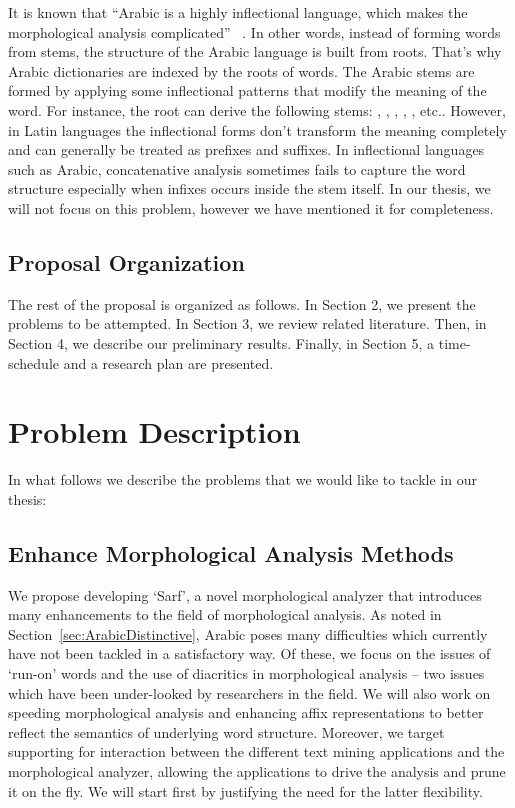 \documentclass[a4,12pt]{report}
\newcommand{\noVocRL}[1]{\transtrue\novocalize\RL{#1}\vocalize}
\begin{document}
	It is known that ``Arabic is a highly inflectional language, which makes the morphological
	analysis complicated'' ~\cite{Attia:08a}. In other words, instead of forming words from stems, the
	structure of the Arabic language is built from roots. That's why Arabic dictionaries are indexed by the roots of words.
	The Arabic stems are formed by applying some inflectional patterns that modify the meaning of the word.
	For instance, the root \noVocRL{drs} can derive the following stems: , , 
	, , , etc..
	However, in Latin languages the inflectional forms don't transform the meaning completely and can generally be treated
	as prefixes and suffixes. In inflectional languages such as Arabic, concatenative analysis sometimes fails to capture the
	word structure especially when infixes occurs inside the stem itself. In our thesis, we will not focus on this problem,
	however we have mentioned it for completeness. 


\section{Proposal Organization} %

The rest of the proposal is organized as follows. In Section 2, we present the problems to be attempted. 
In Section 3, we review related literature. 
Then, in Section 4, we describe our preliminary results. 
Finally, in Section 5, a time-schedule and a research plan are presented.

\chapter{Problem Description}

In what follows we describe the problems that we would like to tackle in our thesis:

\section{Enhance Morphological Analysis Methods}

We propose developing `Sarf', a novel morphological analyzer that introduces many enhancements to the
field of morphological analysis. As noted in Section~\ref{sec:ArabicDistinctive}, 
Arabic poses many difficulties which currently 
have not been tackled in a satisfactory way. Of these, we focus on the issues of `run-on' words and
the use of diacritics in morphological analysis -- two issues which have been under-looked by researchers in the field.
We will also work on speeding morphological analysis and 
enhancing affix representations to better reflect the semantics of underlying word structure.
Moreover, we target supporting for interaction between the different text mining applications 
and the morphological analyzer, 
allowing the applications to drive the analysis and prune it on the fly. 
We will start first by justifying the need for the latter flexibility.
\end{document}
